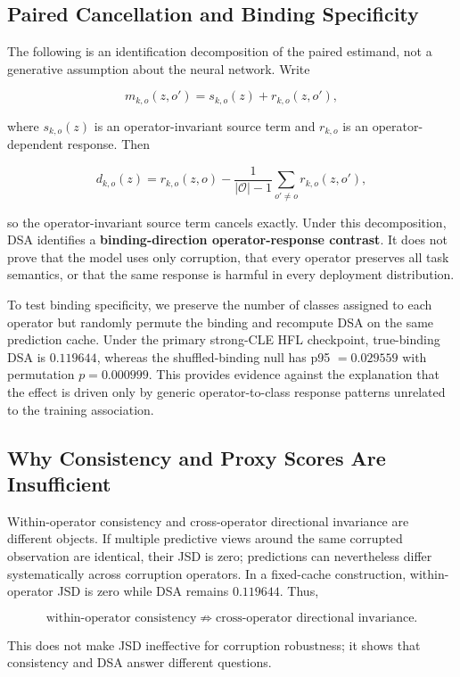 \documentclass[10pt,twocolumn]{article}
\begin{document}
\subsection{Paired Cancellation and Binding Specificity}

The following is an identification decomposition of the paired estimand, not a generative assumption about the neural network. Write

\[
m_{k,o}(z,o')=s_{k,o}(z)+r_{k,o}(z,o'),
\]

where \(s_{k,o}(z)\) is an operator-invariant source term and \(r_{k,o}\) is an operator-dependent response. Then

\[
d_{k,o}(z)=r_{k,o}(z,o)
-\frac{1}{|\mathcal O|-1}\sum_{o'\neq o}r_{k,o}(z,o'),
\]

so the operator-invariant source term cancels exactly. Under this decomposition, DSA identifies a \textbf{binding-direction operator-response contrast}. It does not prove that the model uses only corruption, that every operator preserves all task semantics, or that the same response is harmful in every deployment distribution.

To test binding specificity, we preserve the number of classes assigned to each operator but randomly permute the binding and recompute DSA on the same prediction cache. Under the primary strong-CLE HFL checkpoint, true-binding DSA is \(0.119644\), whereas the shuffled-binding null has p95 \(=0.029559\) with permutation \(p=0.000999\). This provides evidence against the explanation that the effect is driven only by generic operator-to-class response patterns unrelated to the training association.

\subsection{Why Consistency and Proxy Scores Are Insufficient}

Within-operator consistency and cross-operator directional invariance are different objects. If multiple predictive views around the same corrupted observation are identical, their JSD is zero; predictions can nevertheless differ systematically across corruption operators. In a fixed-cache construction, within-operator JSD is zero while DSA remains \(0.119644\). Thus,

\[
\text{within-operator consistency}\not\Rightarrow
\text{cross-operator directional invariance}.
\]

This does not make JSD ineffective for corruption robustness; it shows that consistency and DSA answer different questions.
\end{document}
